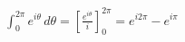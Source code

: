 \documentclass[preview]{standalone}
\begin{document}
\begin{align*}
\int_0^{2\pi} e^{i\theta} \, d\theta = \left[\frac{e^{i\theta}}{i}\right]_0^{2\pi} = e^{i2\pi} - e^{i\pi}
\end{align*}
\end{document}
